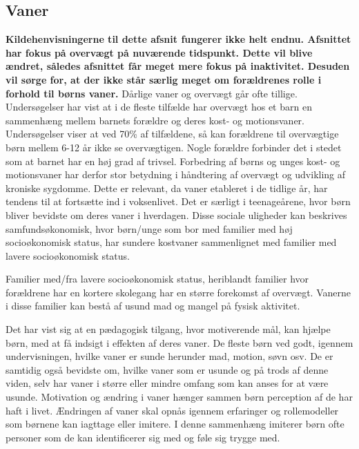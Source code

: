 \subsection{Vaner}
\textbf{Kildehenvisningerne til dette afsnit fungerer ikke helt endnu.
Afsnittet har fokus på overvægt på nuværende tidspunkt. Dette vil blive ændret, således afsnittet får meget mere fokus på inaktivitet.
Desuden vil sørge for, at der ikke står særlig meget om forældrenes rolle i forhold til børns vaner. } 
Dårlige vaner og overvægt går ofte tillige. Undersøgelser har vist at i de fleste tilfælde har overvægt hos et barn en sammenhæng mellem barnets forældre og deres kost- og motionsvaner. Undersøgelser viser at ved 70\% af tilfældene, så kan forældrene til overvægtige børn mellem 6-12 år ikke se overvægtigen. Nogle forældre forbinder det i stedet som at barnet har en høj grad af trivsel.\citep{videnskab} 
Forbedring af børns og unges kost- og motionsvaner har derfor stor betydning i håndtering af overvægt og udvikling af kroniske sygdomme. Dette er relevant, da vaner etableret i de tidlige år, har tendens til at fortsætte ind i voksenlivet.\citep{trends}  Det er særligt i teenageårene, hvor børn bliver bevidste om deres vaner i hverdagen.\citep{dansker} 
Disse sociale uligheder kan beskrives samfundsøkonomisk, hvor børn/unge som bor med familier med høj socioøkonomisk status, har sundere kostvaner sammenlignet med familier med lavere socioøkonomisk status.\citep{trends} 

Familier med/fra lavere socioøkonomisk status, heriblandt familier hvor forældrene har en kortere skolegang har en større forekomst af overvægt. 
Vanerne i disse familier kan bestå af usund mad og mangel på fysisk aktivitet.

Det har vist sig at en pædagogisk tilgang, hvor motiverende mål, kan hjælpe børn, med at få indsigt i effekten af deres vaner. De fleste børn ved godt, igennem undervisningen, hvilke vaner er sunde herunder mad, motion, søvn osv. De er samtidig også bevidste om, hvilke vaner som er usunde og på trods af denne viden, selv har vaner i større eller mindre omfang som kan anses for at være usunde. 
Motivation og ændring i vaner hænger sammen børn perception af de har haft i livet. Ændringen af vaner skal opnås igennem erfaringer og rollemodeller som børnene kan iagttage eller imitere. I denne sammenhæng imiterer børn ofte personer som de kan identificerer sig med og føle sig trygge med.\citep{opsporing}
